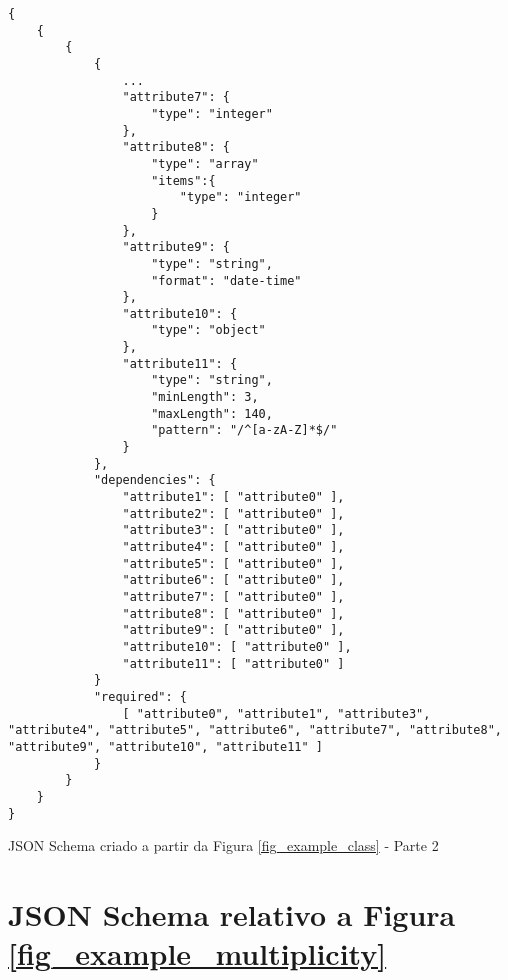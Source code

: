 \begin{anexosenv}
\begin{listing}
\begin{verbatim}
{
    {
        {
            {
                ...
                "attribute7": {
                    "type": "integer"
                },
                "attribute8": {
                    "type": "array"
                    "items":{
                        "type": "integer"
                    }
                },
                "attribute9": {
                    "type": "string",
                    "format": "date-time"
                },
                "attribute10": {
                    "type": "object"
                },
                "attribute11": {
                    "type": "string",
                    "minLength": 3,
                    "maxLength": 140,
                    "pattern": "/^[a-zA-Z]*$/"
                }
            },
            "dependencies": {
                "attribute1": [ "attribute0" ],
                "attribute2": [ "attribute0" ],
                "attribute3": [ "attribute0" ],
                "attribute4": [ "attribute0" ],
                "attribute5": [ "attribute0" ],
                "attribute6": [ "attribute0" ],
                "attribute7": [ "attribute0" ],
                "attribute8": [ "attribute0" ],
                "attribute9": [ "attribute0" ],
                "attribute10": [ "attribute0" ],
                "attribute11": [ "attribute0" ]
            }
            "required": {
                [ "attribute0", "attribute1", "attribute3", "attribute4", "attribute5", "attribute6", "attribute7", "attribute8", "attribute9", "attribute10", "attribute11" ]
            }
        }
    }
}
\end{verbatim}
\caption{JSON Schema criado a partir da Figura \ref{fig_example_class} - Parte 2}
\end{listing}


\chapter{JSON Schema relativo a Figura \ref{fig_example_multiplicity}}
\label{fig_example_multiplicity_j}


\end{anexosenv}
